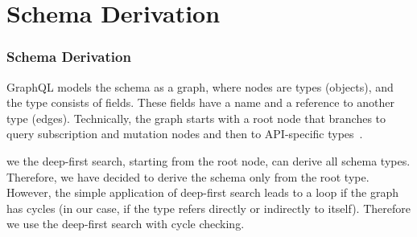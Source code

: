 
\section{Schema Derivation} 
\begin{frame}\frametitle{Schema Derivation}

GraphQL models the schema as a graph, where nodes are types (objects), and the type consists of fields. These fields have a name and a reference to another type (edges). Technically, the graph starts with a root node that branches to query subscription and mutation nodes and then to API-specific types~\cite{migrating-to-gql}. 

we the deep-first search, starting from the root node, can derive all schema types. Therefore, we have decided to derive the schema only from the root type. However, the simple application of deep-first search leads to a loop if the graph has cycles (in our case, if the type refers directly or indirectly to itself). Therefore we use the deep-first search with cycle checking.

\end{frame}
